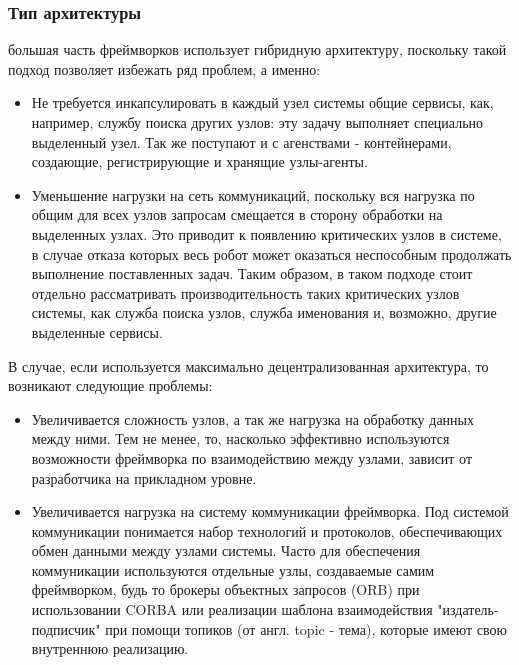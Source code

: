 \subsubsection{Тип архитектуры} большая часть фреймворков использует гибридную архитектуру, поскольку такой подход позволяет избежать ряд проблем, а именно:
\begin{itemize}
	\item Не требуется инкапсулировать в каждый узел системы общие сервисы, как, например, службу поиска других узлов: эту задачу выполняет специально выделенный узел. Так же поступают и с агенствами - контейнерами, создающие, регистрирующие и хранящие узлы-агенты.
	\item Уменьшение нагрузки на сеть коммуникаций, поскольку вся нагрузка по общим для всех узлов запросам смещается в сторону обработки на выделенных узлах. Это приводит к появлению критических узлов в системе, в случае отказа которых весь робот может оказаться неспособным продолжать выполнение поставленных задач. Таким образом, в таком подходе стоит отдельно рассматривать производительность таких критических узлов системы, как служба поиска узлов, служба именования и, возможно, другие выделенные сервисы.
\end{itemize}
В случае, если используется максимально децентрализованная архитектура, то возникают следующие проблемы:
\begin{itemize}
	\item Увеличивается сложность узлов, а так же нагрузка на обработку данных между ними. Тем не менее, то, насколько эффективно используются возможности фреймворка по взаимодействию между узлами, зависит от разработчика на прикладном уровне.
	\item Увеличивается нагрузка на систему коммуникации фреймворка. Под системой коммуникации понимается набор технологий и протоколов, обеспечивающих обмен данными между узлами системы. Часто для обеспечения коммуникации используются отдельные узлы, создаваемые самим фреймворком, будь то брокеры объектных запросов (ORB) при использовании CORBA или реализации шаблона взаимодействия "издатель-подписчик" при помощи топиков (от англ. topic - тема), которые имеют свою внутреннюю реализацию.
\end{itemize}

